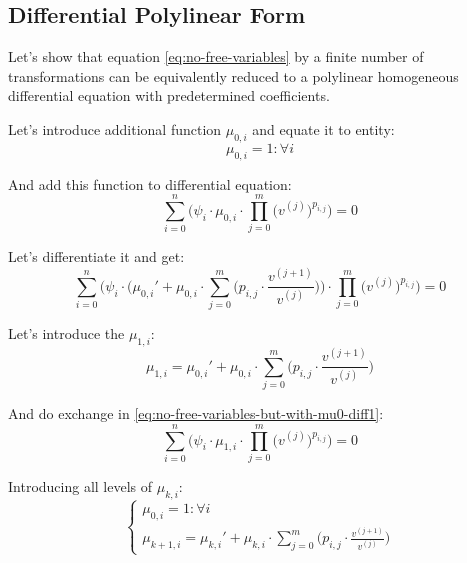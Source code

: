 \documentclass[a4paper, 11pt, oneside]{book}
\begin{document}
\subsection{Differential Polylinear Form}
Let's show that equation \ref{eq:no-free-variables} by a finite number of transformations can be equivalently reduced to a polylinear homogeneous differential equation with predetermined coefficients.

Let's introduce additional function $\mu_{0, i}$ and equate it to entity:
\begin{equation}\label{eq:introducing-mu0}
  \mu_{0, i} = 1: \forall i
\end{equation}

And add this function to differential equation:
\begin{equation}\label{eq:no-free-variables-but-with-mu}
  \sum_{i = 0}^n\bigg(\psi_i \cdot \mu_{0, i} \cdot \prod_{j=0}^m \Big(v^{(j)}\Big)^{p_{i, j}}\bigg) = 0
\end{equation}

Let's differentiate it and get:
\begin{equation}\label{eq:no-free-variables-but-with-mu0-diff1}
  \sum_{i = 0}^n\Bigg(\psi_i \cdot \bigg(\mu_{0, i}' + \mu_{0, i} \cdot \sum_{j = 0}^m\Big(p_{i, j} \cdot \frac{v^{(j + 1)}}{v^{(j)}}\Big)\bigg) \cdot \prod_{j=0}^m \Big(v^{(j)}\Big)^{p_{i, j}}\Bigg) = 0
\end{equation}

Let's introduce the $\mu_{1, i}$:
\begin{equation}\label{eq:introducing-mu1}
  \mu_{1, i} = \mu_{0, i}' + \mu_{0, i} \cdot \sum_{j = 0}^m\Big(p_{i, j} \cdot \frac{v^{(j + 1)}}{v^{(j)}}\Big)
\end{equation}

And do exchange in \ref{eq:no-free-variables-but-with-mu0-diff1}:
\begin{equation}\label{eq:no-free-variables-but-with-mu1-diff1}
  \sum_{i = 0}^n\Bigg(\psi_i \cdot \mu_{1, i} \cdot \prod_{j=0}^m \Big(v^{(j)}\Big)^{p_{i, j}}\Bigg) = 0
\end{equation}

Introducing all levels of $\mu_{k, i}$:
\begin{equation}\label{eq:introducing-all-mu}
  \begin{cases}
    \mu_{0, i} = 1: \forall i \\
    \displaystyle \mu_{k + 1, i} = \mu_{k, i}' + \mu_{k, i} \cdot \sum_{j = 0}^m\Big(p_{i, j} \cdot \frac{v^{(j + 1)}}{v^{(j)}}\Big)
  \end{cases}
\end{equation}
\end{document}
